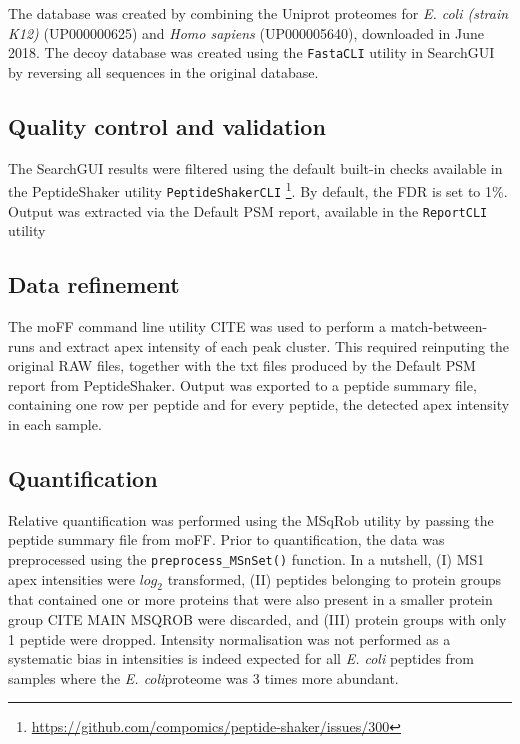 \documentclass[11pt, a4paper]{report}
\begin{document}
The database was created by combining the Uniprot proteomes for \textit{E. coli (strain K12)} (UP000000625) and \textit{Homo sapiens} (UP000005640), downloaded in June 2018. The decoy database was created using the \texttt{FastaCLI} utility in SearchGUI by reversing all sequences in the original database.

\subsection{Quality control and validation}

The SearchGUI results were filtered using the default built-in checks available in the PeptideShaker utility \texttt{PeptideShakerCLI} \footnote{\href{https://github.com/compomics/peptide-shaker/issues/300}{https://github.com/compomics/peptide-shaker/issues/300}}. By default, the FDR is set to 1\%. Output was extracted via the Default PSM report, available in the \texttt{ReportCLI} utility


\subsection{Data refinement}

The moFF command line utility CITE was used to perform a match-between-runs and extract apex intensity of each peak cluster. This required reinputing the original RAW files, together with the txt files produced by the Default PSM report from PeptideShaker. Output was exported to a peptide summary file, containing  one row per peptide and for every peptide, the detected apex intensity in each sample.

\subsection{Quantification}

Relative quantification was performed using the MSqRob utility by passing the peptide summary file from moFF. Prior to quantification, the data was preprocessed using the \texttt{preprocess\_MSnSet()} function. In a nutshell, (I) MS1 apex intensities were $log_2$ transformed, (II) peptides belonging to protein groups that contained one or more proteins that were also present in a smaller protein group CITE MAIN MSQROB were discarded, and (III) protein groups with only 1 peptide were dropped. Intensity normalisation was not performed as a systematic bias in intensities is indeed expected for all \textit{E. coli} peptides from samples where the \textit{E. coli}proteome was 3 times more abundant.
\end{document}
